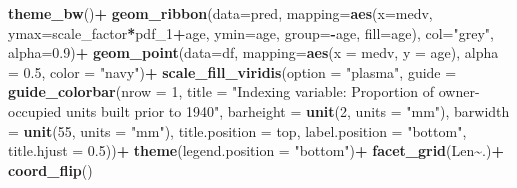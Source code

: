 \documentclass[
]{article}
\newenvironment{Shaded}{\begin{snugshade}}{\end{snugshade}}
\newcommand{\AttributeTok}[1]{\textcolor[rgb]{0.13,0.29,0.53}{#1}}
\newcommand{\DecValTok}[1]{\textcolor[rgb]{0.00,0.00,0.81}{#1}}
\newcommand{\FloatTok}[1]{\textcolor[rgb]{0.00,0.00,0.81}{#1}}
\newcommand{\FunctionTok}[1]{\textcolor[rgb]{0.13,0.29,0.53}{\textbf{#1}}}
\newcommand{\NormalTok}[1]{#1}
\newcommand{\SpecialCharTok}[1]{\textcolor[rgb]{0.81,0.36,0.00}{\textbf{#1}}}
\newcommand{\StringTok}[1]{\textcolor[rgb]{0.31,0.60,0.02}{#1}}
\begin{document}
\begin{Shaded}
\begin{Highlighting}[]
  \FunctionTok{theme\_bw}\NormalTok{()}\SpecialCharTok{+}
  \FunctionTok{geom\_ribbon}\NormalTok{(}\AttributeTok{data=}\NormalTok{pred,}
              \AttributeTok{mapping=}\FunctionTok{aes}\NormalTok{(}\AttributeTok{x=}\NormalTok{medv, }\AttributeTok{ymax=}\NormalTok{scale\_factor}\SpecialCharTok{*}\NormalTok{pdf\_1}\SpecialCharTok{+}\NormalTok{age, }
                          \AttributeTok{ymin=}\NormalTok{age, }\AttributeTok{group=}\SpecialCharTok{{-}}\NormalTok{age, }\AttributeTok{fill=}\NormalTok{age),}
              \AttributeTok{col=}\StringTok{"grey"}\NormalTok{, }\AttributeTok{alpha=}\FloatTok{0.9}\NormalTok{)}\SpecialCharTok{+}
  \FunctionTok{geom\_point}\NormalTok{(}\AttributeTok{data=}\NormalTok{df,}
             \AttributeTok{mapping=}\FunctionTok{aes}\NormalTok{(}\AttributeTok{x =}\NormalTok{ medv, }\AttributeTok{y =}\NormalTok{ age), }\AttributeTok{alpha =} \FloatTok{0.5}\NormalTok{, }\AttributeTok{color =} \StringTok{"navy"}\NormalTok{)}\SpecialCharTok{+}
  \FunctionTok{scale\_fill\_viridis}\NormalTok{(}\AttributeTok{option =} \StringTok{"plasma"}\NormalTok{,}
                     \AttributeTok{guide =} \FunctionTok{guide\_colorbar}\NormalTok{(}\AttributeTok{nrow =} \DecValTok{1}\NormalTok{,}
                                            \AttributeTok{title =} \StringTok{"Indexing variable: Proportion of owner{-}occupied units built prior to 1940"}\NormalTok{,}
                                            \AttributeTok{barheight =} \FunctionTok{unit}\NormalTok{(}\DecValTok{2}\NormalTok{, }\AttributeTok{units =} \StringTok{"mm"}\NormalTok{),}
                                            \AttributeTok{barwidth =} \FunctionTok{unit}\NormalTok{(}\DecValTok{55}\NormalTok{, }\AttributeTok{units =} \StringTok{"mm"}\NormalTok{),}
                                            \AttributeTok{title.position =} \StringTok{\textquotesingle{}top\textquotesingle{}}\NormalTok{,}
                                            \AttributeTok{label.position =} \StringTok{"bottom"}\NormalTok{,}
                                            \AttributeTok{title.hjust =} \FloatTok{0.5}\NormalTok{))}\SpecialCharTok{+}
  \FunctionTok{theme}\NormalTok{(}\AttributeTok{legend.position =} \StringTok{"bottom"}\NormalTok{)}\SpecialCharTok{+}
  \FunctionTok{facet\_grid}\NormalTok{(Len}\SpecialCharTok{\textasciitilde{}}\NormalTok{.)}\SpecialCharTok{+}
  \FunctionTok{coord\_flip}\NormalTok{()}
\end{Highlighting}
\end{Shaded}
\end{document}
